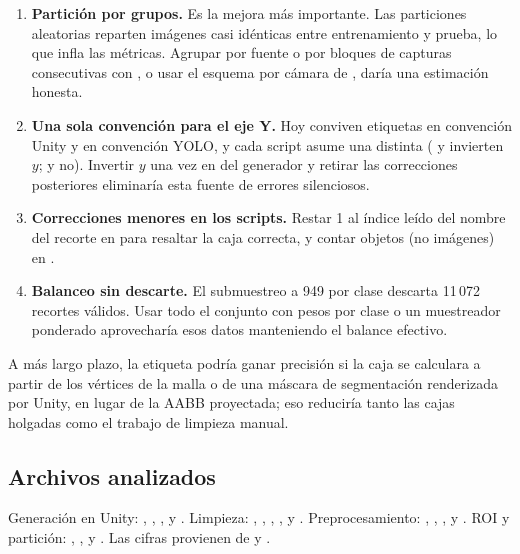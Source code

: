 \documentclass[11pt,a4paper]{article}
\begin{document}
\begin{enumerate}[leftmargin=*]
  \item \textbf{Partición por grupos.} Es la mejora más importante. Las particiones aleatorias reparten imágenes casi idénticas entre entrenamiento y prueba, lo que infla las métricas. Agrupar por fuente o por bloques de capturas consecutivas con , o usar el esquema por cámara de , daría una estimación honesta.
  \item \textbf{Una sola convención para el eje Y.} Hoy conviven etiquetas en convención Unity y en convención YOLO, y cada script asume una distinta ( y  invierten $y$;  y  no). Invertir $y$ una vez en  del generador y retirar las correcciones posteriores eliminaría esta fuente de errores silenciosos.
  \item \textbf{Correcciones menores en los scripts.} Restar 1 al índice leído del nombre del recorte en  para resaltar la caja correcta, y contar objetos (no imágenes) en .
  \item \textbf{Balanceo sin descarte.} El submuestreo a 949 por clase descarta 11\,072 recortes válidos. Usar todo el conjunto con pesos por clase o un muestreador ponderado aprovecharía esos datos manteniendo el balance efectivo.
\end{enumerate}

A más largo plazo, la etiqueta podría ganar precisión si la caja se calculara a partir de los vértices de la malla o de una máscara de segmentación renderizada por Unity, en lugar de la AABB proyectada; eso reduciría tanto las cajas holgadas como el trabajo de limpieza manual.

\subsection*{Archivos analizados}

Generación en Unity: , , ,  y . Limpieza: , , , ,  y . Preprocesamiento: , , ,  y . ROI y partición: , ,  y . Las cifras provienen de  y .
\end{document}
